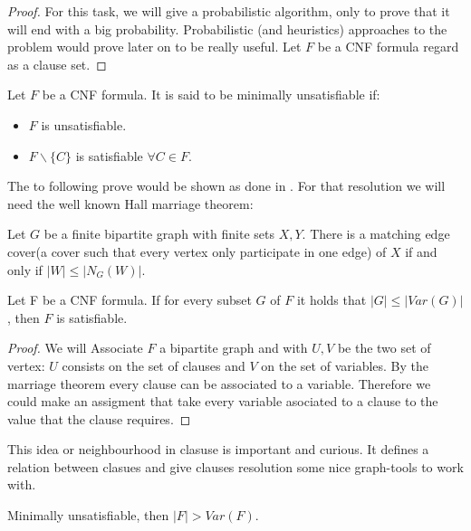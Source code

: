 \begin{proof}
For this task, we will give a probabilistic algorithm, only to prove that it will end with a big probability. Probabilistic (and heuristics) approaches to the problem would prove later on to be really useful. Let $F$ be a CNF formula regard as a clause set.
\end{proof}



\begin{definition}
Let $F$ be a CNF formula. It is said to be minimally unsatisfiable if:
\begin{itemize}
	\item $F$ is unsatisfiable.
	\item $F\backslash \{C\}$ is satisfiable $\forall C \in F$.
\end{itemize}
\end{definition}


The to following prove would be shown as done in \cite{schoning2013satisfiability}. For that resolution we will need the well known Hall marriage theorem\cite{hall2009representatives}:

\begin{theorem}
  Let $G$ be a finite bipartite graph with finite sets $X,Y$. There is a matching edge cover(a cover such that every vertex only participate in one edge) of $X$ if and only if $|W| \le |N_G(W)|$.  
\end{theorem}


\begin{lemma}
Let F be a CNF formula. If for every subset $G$ of $F$ it holds that $|G|\le |Var(G)|$, then $F$ is satisfiable.
\end{lemma}

\begin{proof}
 We will Associate $F$ a bipartite graph and with $U, V$ be the two set of vertex: $U$ consists on the set of clauses and $V$ on the set of variables. By the marriage theorem every clause can be associated to a variable. Therefore we could make an assigment that take every variable asociated to a clause to the value that the clause requires.
\end{proof}

This idea or neighbourhood in clasuse is important and curious. It defines a relation between clasues and give clauses resolution some nice graph-tools to work with.


\begin{proposition}
	Minimally unsatisfiable, then $|F| > Var(F)$.
\end{proposition}

